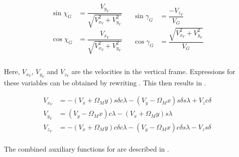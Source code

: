 \begin{align} \label{eq:velAngl}
\begin{split}
\sin \chi_{G} &= \dfrac{V_{y_{V}}}{\sqrt{V_{x_{V}}^{2}+V_{y_{V}}^{2}}} \\
\cos \chi_{G} &= \dfrac{V_{x_{V}}}{\sqrt{V_{x_{V}}^{2}+V_{y_{V}}^{2}}} \\
\end{split}
&
\begin{split}
\sin \gamma_{G} &= \dfrac{-V_{z_{V}}}{V_{G}}\\
\cos \gamma_{G} &= \dfrac{\sqrt{V_{x_{V}}^{2}+V_{y_{V}}^{2}}}{V_{G}}\\
\end{split} 
\end{align} 

\noindent
Here, $V_{x_{V}}$, $V_{y_{V}}$ and $V_{z_{V}}$ are the velocities in the vertical frame. Expressions for these variables can be obtained by rewriting . This then results in .


\begin{equation} \label{eq:VV}
\begin{split}
V_{x_{V}} & = -\left(V_{x}+\Omega_{M}y\right) s \delta c\lambda - \left(V_{y}-\Omega_{M}x\right) s\delta s\lambda+V_{z}c\delta \\
V_{y_{V}} & = \left(V_{y}-\Omega_{M}x\right) c\lambda - \left(V_{x}+\Omega_{M} y \right) s\lambda \\
V_{z_{V}} & = -\left(V_{x}+\Omega_{M}y\right)c\delta c\lambda-\left(V_{y}-\Omega_{M}x\right) c\delta s\lambda - V_{z} s\delta \\
\end{split}
\end{equation}

\noindent
The combined auxiliary functions for  are described in .

